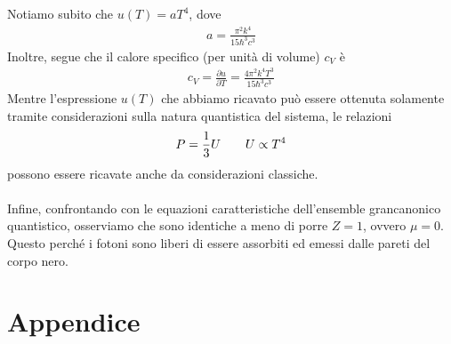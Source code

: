 \documentclass{article}
\begin{document}
Notiamo subito che $u(T) = aT^4$, dove
\begin{align}
    a = \frac{\pi^2k^4}{15\hbar^3c^3} \tag{4.7.10}
\end{align}
Inoltre, segue che il calore specifico (per unità di volume) $c_V$ è
\begin{align}
    c_V = \frac{\partial u}{\partial T} = \frac{4\pi^2k^4T^3}{15\hbar^3c^3} \tag{4.7.11}
\end{align}
Mentre l'espressione $u(T)$ che abbiamo ricavato può essere ottenuta solamente tramite considerazioni sulla natura quantistica del sistema, le relazioni
\begin{align}
    P = \frac{1}{3}U \qquad U \propto T^4 \notag
\end{align}
possono essere ricavate anche da considerazioni classiche. \\ \\
Infine, confrontando con le equazioni caratteristiche dell'ensemble grancanonico quantistico, osserviamo che sono identiche a meno di porre $Z = 1$, ovvero $\mu = 0$. Questo perché i fotoni sono liberi di essere assorbiti ed emessi dalle pareti del corpo nero.











\newpage
\section*{Appendice}
\end{document}
